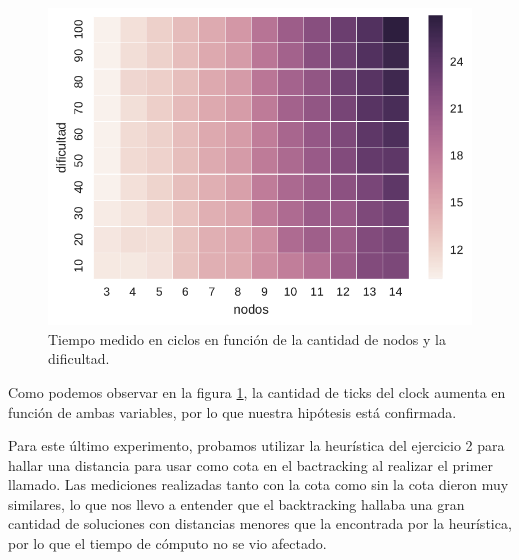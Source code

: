 \begin{figure}[H]
  \begin{center}
    \includegraphics{../experimentacion/ej1/ej1_conHeuristica.pdf}
    \caption{Tiempo medido en ciclos en función de la cantidad de nodos y la dificultad.}
    \label{fig:ej1_conHeuristica}
  \end{center}
\end{figure}

Como podemos observar en la figura \ref{fig:ej1_conHeuristica}, la cantidad de ticks del clock aumenta en función de ambas variables, por lo que nuestra hipótesis está confirmada.

Para este último experimento, probamos utilizar la heurística del ejercicio 2 para hallar una distancia para usar como cota en el bactracking al realizar el primer llamado. Las mediciones realizadas tanto con la cota como sin la cota dieron muy similares, lo que nos llevo a entender que el backtracking hallaba una gran cantidad de soluciones con distancias menores que la encontrada por la heurística, por lo que el tiempo de cómputo no se vio afectado. 
